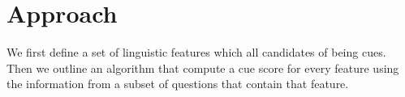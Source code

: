 \section{Approach}
\label{sec:approach}


We first define a set of linguistic features which all candidates of
being cues. Then we outline an algorithm that compute a cue score for
every feature using the information from a subset of questions that 
contain that feature.


